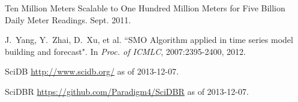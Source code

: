 \documentclass[a4paper,12pt]{llncs}
\begin{document}
\medskip
\begin{thebibliography}{1}

Ten Million Meters Scalable to One Hundred Million Meters for Five Billion Daily Meter Readings. Sept. 2011.

J.~Yang, Y.~Zhai, D.~Xu, et al. ``SMO Algorithm applied in
time series model building and forecast". In {\em Proc. of ICMLC}, 2007:2395-2400, 2012.

SciDB \url{http://www.scidb.org/} as of 2013-12-07.

SciDBR \url{https://github.com/Paradigm4/SciDBR} as of 2013-12-07.




\end{thebibliography}
\end{document}
